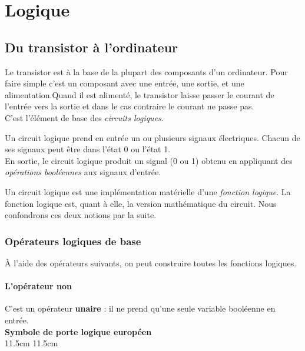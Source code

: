 \documentclass[a4paper,12pt,french]{book}
\begin{document}
\chapter*{Logique}

\section{Du transistor à l'ordinateur}

Le transistor est à la base de la plupart des composants d'un ordinateur. Pour faire simple c'est un composant avec une entrée, une sortie, et une alimentation.Quand il est alimenté, le transistor laisse passer le courant de l'entrée vers la sortie et dans le cas contraire le courant ne passe pas.\\
C'est l'élément de base des \textit{circuits logiques}. 
\begin{definition}
	Un circuit logique prend en entrée un ou plusieurs signaux électriques. Chacun de ses signaux peut être dans l'état 0 ou l'état 1.\\
	En sortie, le circuit logique produit un signal (0 ou 1) obtenu en appliquant des \textit{opérations booléennes} aux signaux d'entrée.
\end{definition}

Un circuit logique est une implémentation matérielle d'une \textit{fonction logique}. La fonction logique est, quant à elle, la version \og mathématique\fg{} du circuit. Nous confondrons ces deux notions par la suite.

\subsection{Opérateurs logiques de base}

À l'aide des opérateurs suivants, on peut construire toutes les fonctions logiques.

\subsubsection*{L'opérateur \og non\fg{}}

C'est un opérateur \textbf{unaire} : il ne prend qu'une seule variable booléenne en entrée.\\

{
	\textbf{Symbole de porte logique européen}\\}{11.5cm}
{
	}{11.5cm}
\end{document}

